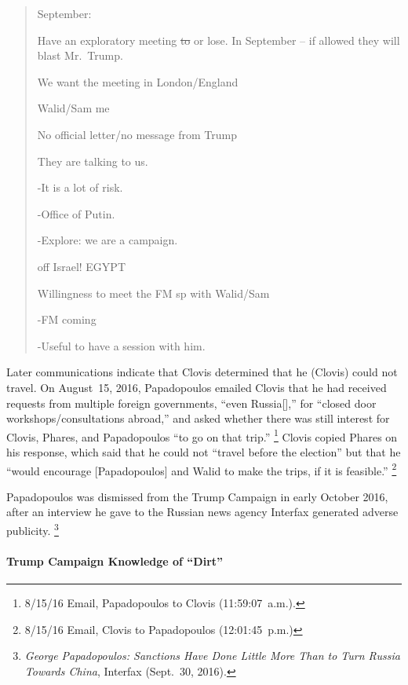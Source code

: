 \begin{quote}
September:

Have an exploratory meeting \sout{to} or lose.
In September -- if allowed they will blast Mr.~Trump.

We want the meeting in London/England

Walid/Sam me

No official letter/no message from Trump

They are talking to us.

-It is a lot of risk.

-Office of Putin.

-Explore: we are a campaign.

off Israel! EGYPT

Willingness to meet the FM sp with Walid/Sam

-FM coming

-Useful to have a session with him.
\end{quote}

Later communications indicate that Clovis determined that he (Clovis) could not travel.
On August~15, 2016, Papadopoulos emailed Clovis that he had received requests from multiple foreign governments, ``even Russia[],'' for ``closed door workshops/consultations abroad,'' and asked whether there was still interest for Clovis, Phares, and Papadopoulos ``to go on that trip.''%
\footnote{8/15/16 Email, Papadopoulos to Clovis (11:59:07~a.m.).}
Clovis copied Phares on his response, which said that he could not ``travel before the election'' but that he ``would encourage [Papadopoulos] and Walid to make the trips, if it is feasible.''%
\footnote{8/15/16 Email, Clovis to Papadopoulos (12:01:45~p.m.)}

Papadopoulos was dismissed from the Trump Campaign in early October 2016, after an interview he gave to the Russian news agency Interfax generated adverse publicity.%
\footnote{\textit{George Papadopoulos: Sanctions Have Done Little More Than to Turn Russia Towards China}, Interfax (Sept.~30, 2016).}

\paragraph{Trump Campaign Knowledge of ``Dirt''}

